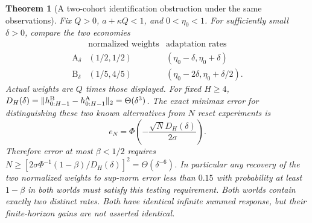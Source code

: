 \documentclass[12pt]{article}
\newtheorem{theorem}{Theorem}[section]
\theoremstyle{definition}
\theoremstyle{remark}
\begin{document}
\begin{theorem}[A two-cohort identification obstruction under the same observations]\label{fhc:pair}
Fix $Q>0$, $a+\kappa Q<1$, and $0<\eta_0<1$. For sufficiently small
$\delta>0$, compare the two economies
\[
\begin{array}{c|cc}
 &\text{normalized weights}&\text{adaptation rates}\\ \hline
\mathrm A_\delta &(1/2,1/2)&(\eta_0-\delta,\eta_0+\delta)\\
\mathrm B_\delta &(1/5,4/5)&(\eta_0-2\delta,\eta_0+\delta/2).
\end{array}
\]
Actual weights are $Q$ times those displayed. For fixed $H\ge4$,
$D_H(\delta)=\|h^{\rm B}_{0:H-1}-h^{\rm A}_{0:H-1}\|_2
=\Theta(\delta^3)$. The exact minimax error for distinguishing these
two \emph{known} alternatives from $N$ reset experiments is
\[
 e_N=\Phi\!\left(-\frac{\sqrt N D_H(\delta)}{2\sigma}\right).
\]
Therefore error at most $\beta<1/2$ requires
$N\ge[2\sigma\Phi^{-1}(1-\beta)/D_H(\delta)]^2
=\Theta(\delta^{-6})$.
In particular any recovery of the two normalized weights to sup-norm error
less than $0.15$ with probability at least $1-\beta$ in both worlds must
satisfy this testing requirement.
Both worlds contain exactly two distinct rates. Both have identical infinite
summed response, but their finite-horizon gains are not asserted identical.
\end{theorem}
\end{document}
